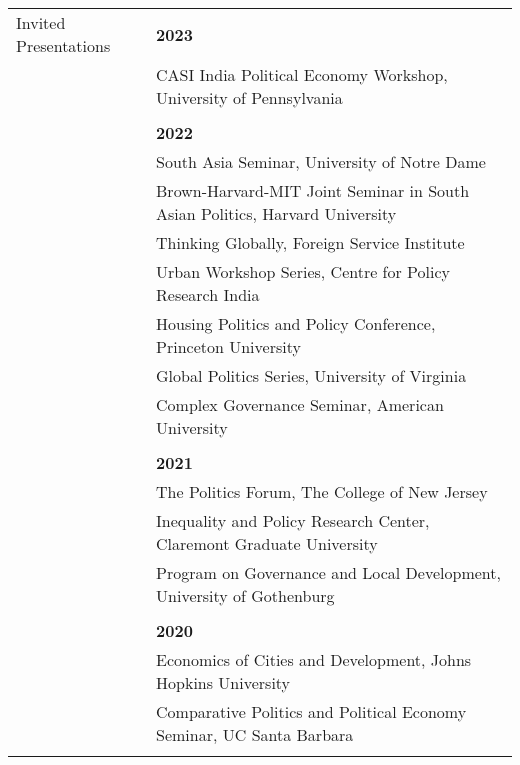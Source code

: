 \documentclass[letterpaper, 10pt]{article}
\begin{document}
\begin{longtable}{p{1.5in}p{5in}}
{{Invited Presentations}} 
& \textbf{2023}\\ & CASI India Political Economy Workshop, University of Pennsylvania\\
&\\
& \textbf{2022}\\
     &South Asia Seminar, University of Notre Dame\\
       &Brown-Harvard-MIT Joint Seminar in South Asian Politics, Harvard University\\
        &Thinking Globally, Foreign Service Institute \\
         &Urban Workshop Series, Centre for Policy Research India\\
           &Housing Politics and Policy Conference, Princeton University\\
 &Global Politics Series, University of Virginia\\
&Complex Governance Seminar, American University\\


 
   
   
&\\

&\textbf{2021}\\
&The Politics Forum, The College of New Jersey\\
 &Inequality and Policy Research Center, Claremont Graduate University\\
   &Program on Governance and Local Development, University of Gothenburg\\
 
 &\\
 &\textbf{2020}\\
 & Economics of Cities and Development, Johns Hopkins University\\
 & Comparative Politics and Political Economy Seminar, UC Santa Barbara\\
 &\\


% 
 


\end{longtable}
\end{document}
